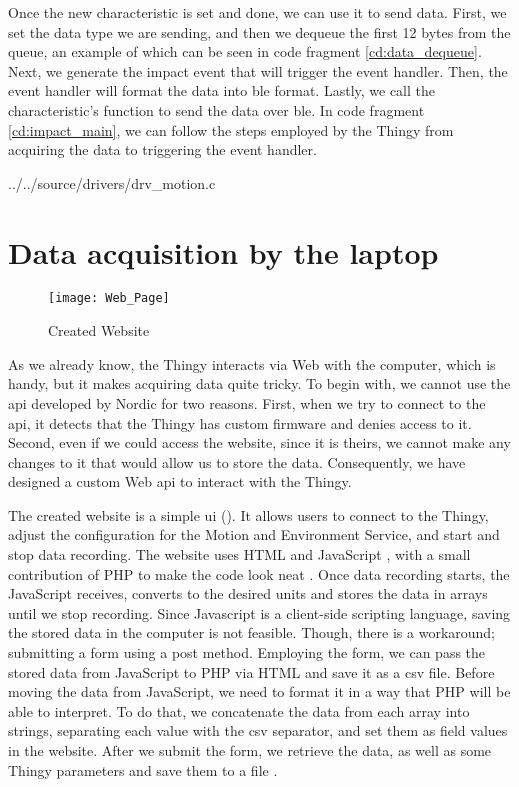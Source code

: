 Once the new characteristic is set and done, we can use it to send data. First, we set the data type we are sending, and then we dequeue the first 12 bytes from the queue, an example of which can be seen in code fragment \ref{cd:data_dequeue}. Next, we generate the impact event that will trigger the event handler. Then, the event handler will format the data into \gls{ble} format. Lastly, we call the characteristic's function to send the data over \gls{ble}. In code fragment \ref{cd:impact_main}, we can follow the steps employed by the Thingy from acquiring the data to triggering the event handler.




{../../source/drivers/drv_motion.c}

\section{Data acquisition by the laptop}
\begin{figure}[hbt!]
	\centering
	\texttt{[image: Web\_Page]}
	\caption{Created Website}
	\label{fig:webpage}
\end{figure}

As we already know, the Thingy interacts via Web \bt with the computer, which is handy, but it makes acquiring data quite tricky. To begin with, we cannot use the \gls{api} developed by Nordic for two reasons. First, when we try to connect to the \gls{api}, it detects that the Thingy has custom firmware and denies access to it. Second, even if we could access the website, since it is theirs, we cannot make any changes to it that would allow us to store the data. Consequently, we have designed a custom Web \bt \gls{api} to interact with the Thingy.

The created website is a simple \gls{ui} (). It allows users to connect to the Thingy, adjust the configuration for the Motion and Environment Service, and start and stop data recording. The website uses HTML  and JavaScript , with a small contribution of PHP to make the code look neat  . Once data recording starts, the JavaScript receives, converts to the desired units and stores the data in arrays until we stop recording. Since Javascript is a client-side scripting language, saving the stored data in the computer is not feasible. Though, there is a workaround; submitting a form using a post method. Employing the form, we can pass the stored data from JavaScript to PHP via HTML and save it as a \gls{csv} file. Before moving the data from JavaScript, we need to format it in a way that PHP will be able to interpret. To do that, we concatenate the data from each array into strings, separating each value with the \gls{csv} separator, and set them as field values in the website. After we submit the form, we retrieve the data, as well as some Thingy parameters and save them to a file .


